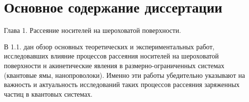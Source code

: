 \newcommand{\actuality}{\underline{\textbf{\actualityTXT}}}
\newcommand{\progress}{\underline{\textbf{\progressTXT}}}
\newcommand{\aim}{\underline{{\textbf\aimTXT}}}
\newcommand{\tasks}{\underline{\textbf{\tasksTXT}}}
\newcommand{\novelty}{\underline{\textbf{\noveltyTXT}}}
\newcommand{\influence}{\underline{\textbf{\influenceTXT}}}
\newcommand{\methods}{\underline{\textbf{\methodsTXT}}}
\newcommand{\defpositions}{\underline{\textbf{\defpositionsTXT}}}
\newcommand{\reliability}{\underline{\textbf{\reliabilityTXT}}}
\newcommand{\probation}{\underline{\textbf{\probationTXT}}}
\newcommand{\contribution}{\underline{\textbf{\contributionTXT}}}
\newcommand{\publications}{\underline{\textbf{\publicationsTXT}}}



\section*{Основное содержание диссертации}

Глава 1. Рассеяние носителей на шероховатой поверхности.

В 1.1. дан обзор основных теоретических и экспериментальных работ, исследовавших влияние процессов рассеяния носителей на шероховатой поверхности н акинетические явления в размерно-ограниченных системах (квантовые ямы, нанопроволоки). Именно эти работы убедительно указывают на важность и актуальность исследований таких процессов рассеяния заряженных частиц в квантовых системах.

